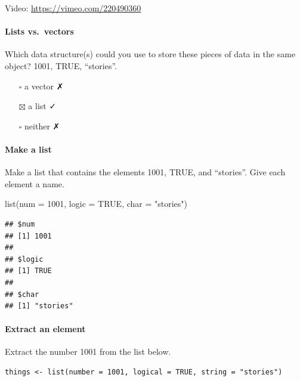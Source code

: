 \documentclass[
]{article}
\newenvironment{Shaded}{\begin{snugshade}}{\end{snugshade}}
\newcommand{\AttributeTok}[1]{\textcolor[rgb]{0.77,0.63,0.00}{#1}}
\newcommand{\ConstantTok}[1]{\textcolor[rgb]{0.00,0.00,0.00}{#1}}
\newcommand{\DecValTok}[1]{\textcolor[rgb]{0.00,0.00,0.81}{#1}}
\newcommand{\FunctionTok}[1]{\textcolor[rgb]{0.00,0.00,0.00}{#1}}
\newcommand{\NormalTok}[1]{#1}
\newcommand{\OtherTok}[1]{\textcolor[rgb]{0.56,0.35,0.01}{#1}}
\newcommand{\SpecialCharTok}[1]{\textcolor[rgb]{0.00,0.00,0.00}{#1}}
\newcommand{\StringTok}[1]{\textcolor[rgb]{0.31,0.60,0.02}{#1}}
\providecommand{\tightlist}{%
  \setlength{\itemsep}{0pt}\setlength{\parskip}{0pt}}
\begin{document}
Video: \url{https://vimeo.com/220490360}

\hypertarget{lists-vs.-vectors}{%
\paragraph{Lists vs.~vectors}\label{lists-vs.-vectors}}

Which data structure(s) could you use to store these pieces of data in
the same object? 1001, TRUE, ``stories''.

\begin{itemize}
\tightlist
\item[$\square$]
  a vector ✗
\item[$\boxtimes$]
  a list ✓
\item[$\square$]
  neither ✗
\end{itemize}

\hypertarget{make-a-list}{%
\paragraph{Make a list}\label{make-a-list}}

Make a list that contains the elements 1001, TRUE, and ``stories''. Give
each element a name.

\begin{Shaded}
\begin{Highlighting}[]
\FunctionTok{list}\NormalTok{(}\AttributeTok{num =} \DecValTok{1001}\NormalTok{, }\AttributeTok{logic =} \ConstantTok{TRUE}\NormalTok{, }\AttributeTok{char =} \StringTok{"stories"}\NormalTok{)}
\end{Highlighting}
\end{Shaded}

\begin{verbatim}
## $num
## [1] 1001
## 
## $logic
## [1] TRUE
## 
## $char
## [1] "stories"
\end{verbatim}

\hypertarget{extract-an-element}{%
\paragraph{Extract an element}\label{extract-an-element}}

Extract the number 1001 from the list below.

\begin{verbatim}
things <- list(number = 1001, logical = TRUE, string = "stories")
\end{verbatim}

\begin{Shaded}
\end{Shaded}
\end{document}
